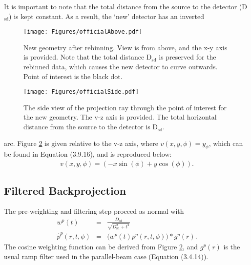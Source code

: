 \documentclass[12pt]{elsarticle}
\begin{document}
It is important to note that the total distance from the source to the detector (D$_\mathrm{sd}$) is kept 
constant. As a result, the `new' detector has an inverted


\begin{figure}[tbh]
\centering
\texttt{[image: Figures/officialAbove.pdf]}
\caption{New geometry after rebinning. View is from above, and the x-y axis is provided. Note that the 
total distance D$_\mathrm{sd}$ is preserved for the rebinned data, which causes the new detector 
to curve outwards. Point of interest is the black dot.}
\label{fig:above}
\end{figure}

\begin{figure}[tbh]
\centering
\texttt{[image: Figures/officialSide.pdf]}
\caption{The side view of the projection ray through the point of interest for the new geometry. The v-z axis is provided. The
total horizontal distance from the source to the detector is D$_\mathrm{sd}$.}
\label{fig:side}
\end{figure}
\clearpage 
\noindent arc. Figure \ref{fig:side} is given relative to the v-z
axis, where $v(x,y,\phi) = y_\phi$, which can be found in Equation (3.9.16), and is reproduced below:
\begin{eqnarray*}
v(x,y,\phi) = (-x \sin(\phi) + y \cos(\phi)).
\end{eqnarray*} 

\subsection{Filtered Backprojection}
The pre-weighting and filtering step proceed as normal with
\begin{eqnarray*}
w^p(t) &=& \frac{D_\mathrm{sd}}{\sqrt{D_\mathrm{sd}^2 + t^2}} \\
\hat{p}^p(r,t,\phi) &=& \Big(w^p(t) p^p(r,t,\phi)\Big) * g^p(r).
\end{eqnarray*}
The cosine weighting function can be derived from Figure \ref{fig:side}, and $g^p(r)$ is the usual
ramp filter used in the parallel-beam case (Equation (3.4.14)).
\end{document}
